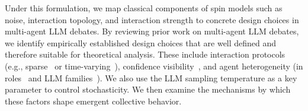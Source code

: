 \documentclass{article}
\theoremstyle{plain}
\theoremstyle{definition}
\theoremstyle{remark}
\begin{document}
Under this formulation, we map classical components of spin models such as noise, 
interaction topology, and interaction strength to concrete design choices in multi-agent LLM debates. 
By reviewing prior work on multi-agent LLM debates, we identify empirically established design choices that are well defined and therefore suitable for theoretical analysis. These include interaction protocols (e.g., sparse~\cite{li-etal-2024-improving-multi} or time-varying~\cite{chen2023agentverse}), confidence visibility~\cite{eo2025debate}, and agent heterogeneity (in roles~\cite{liang2023encouraging,chen2023agentverse} and LLM families~\cite{chen2024reconcile,eo2025debate}). 
We also use the LLM sampling temperature as a key parameter to control stochasticity. 
We then examine the mechanisms by which these factors shape emergent collective behavior. 
\end{document}
